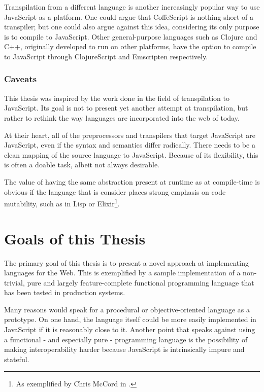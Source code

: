 \documentclass[oneside,11pt,xetex]{scrbook}
\begin{document}
Transpilation from a different language is another increasingly popular
way to use JavaScript as a platform. One could argue that CoffeScript
is nothing short of a transpiler; but one could also argue against this idea,
considering its only purpose is to compile to JavaScript. Other general-purpose
languages such as Clojure and C++, originally developed to run on other platforms,
have the option to compile to JavaScript through ClojureScript \parencite{CLJS} and
Emscripten \parencite{ZAKA} respectively.

\subsubsection{Caveats}

This thesis was inspired by the work done in the field of transpilation to
JavaScript. Its goal is not to present yet another attempt at transpilation,
but rather to rethink the way languages are incorporated into the web of today.

At their heart, all of the preprocessors and transpilers that target JavaScript
are JavaScript, even if the syntax and semantics differ radically. There needs
to be a clean mapping of the source language to JavaScript. Because of its flexibility,
this is often a doable task, albeit not always desirable.

The value of having the same abstraction present at runtime as at compile-time
is obvious if the language that is consider places strong emphasis on code
mutability, such as in Lisp or Elixir\footnote{As exemplified by Chris McCord in
\parencite{ELIX}.}.

\section{Goals of this Thesis}

The primary goal of this thesis is to present a novel approach at implementing languages
for the Web. This is exemplified by a sample implementation of a non-trivial, pure and
largely feature-complete functional programming language that has been tested
in production systems.

Many reasons would speak for a procedural or objective-oriented language as
a prototype. On one hand, the language itself could be more easily implemented in
JavaScript if it is reasonably close to it. Another point that speaks
against using a functional - and especially pure - programming language is the possibility of
making interoperability harder because JavaScript is intrinsically
impure and stateful.
\end{document}
